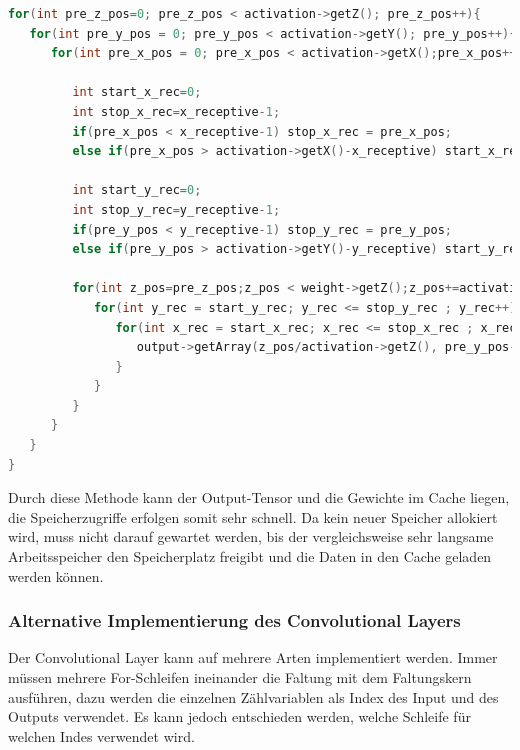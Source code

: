 \documentclass[../main.tex]{subfiles}
\begin{document}
\begin{lstlisting}[language=c++, caption=Convolution: Activation durchgehen, captionpos=b, label=listing:conv_activation, frame=single, linewidth=\textwidth, breaklines=true]
for(int pre_z_pos=0; pre_z_pos < activation->getZ(); pre_z_pos++){
   for(int pre_y_pos = 0; pre_y_pos < activation->getY(); pre_y_pos++){
      for(int pre_x_pos = 0; pre_x_pos < activation->getX();pre_x_pos++){

         int start_x_rec=0;
         int stop_x_rec=x_receptive-1;
         if(pre_x_pos < x_receptive-1) stop_x_rec = pre_x_pos;
         else if(pre_x_pos > activation->getX()-x_receptive) start_x_rec = x_receptive + pre_x_pos - activation->getX();

         int start_y_rec=0;
         int stop_y_rec=y_receptive-1;
         if(pre_y_pos < y_receptive-1) stop_y_rec = pre_y_pos;
         else if(pre_y_pos > activation->getY()-y_receptive) start_y_rec = y_receptive + pre_y_pos - activ[language=c++]ation->getY();
         
         for(int z_pos=pre_z_pos;z_pos < weight->getZ();z_pos+=activation->getZ()){
            for(int y_rec = start_y_rec; y_rec <= stop_y_rec ; y_rec++){
               for(int x_rec = start_x_rec; x_rec <= stop_x_rec ; x_rec++){
                  output->getArray(z_pos/activation->getZ(), pre_y_pos-y_rec)[pre_x_pos-x_rec] += activation->getArray(pre_z_pos,pre_y_pos)[pre_x_pos] * weight->getArray(z_pos,y_rec)[x_rec];
               }
            }
         }
      }
   }
}
\end{lstlisting}

Durch diese Methode kann der Output-Tensor und die Gewichte im Cache liegen, die Speicherzugriffe erfolgen somit sehr schnell. Da kein neuer Speicher allokiert wird, muss nicht darauf gewartet werden, bis der vergleichsweise sehr langsame Arbeitsspeicher den Speicherplatz freigibt und die Daten in den Cache geladen werden können. 

\subsubsection{Alternative Implementierung des Convolutional Layers}

Der Convolutional Layer kann auf mehrere Arten implementiert werden. Immer müssen mehrere For-Schleifen ineinander die Faltung mit dem Faltungskern ausführen, dazu werden die einzelnen Zählvariablen als Index des Input und des Outputs verwendet. Es kann jedoch entschieden werden, welche Schleife für welchen Indes verwendet wird.
\end{document}
